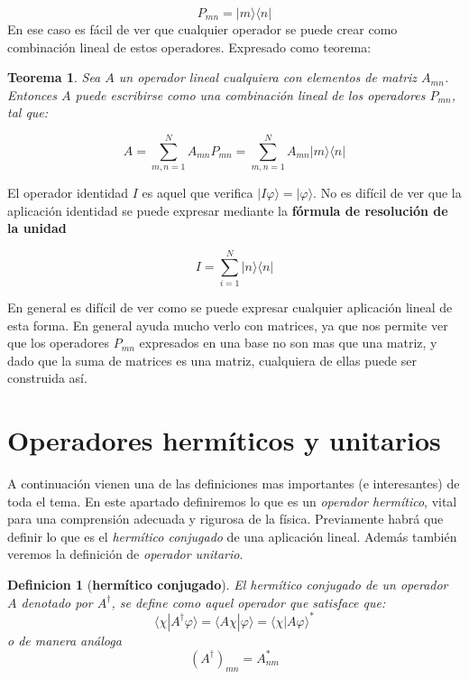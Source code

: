 \documentclass[12pt]{book}
\numberwithin{equation}{chapter}
\numberwithin{figure}{chapter}
\newtheorem{theorem}{Teorema}[section]
\newtheorem{definition}{Definicion}[section]
\begin{document}
\begin{equation}
P_{mn} = | m \rangle \langle n |
\end{equation}
En ese caso es fácil de ver que cualquier operador se puede crear como combinación lineal de estos operadores. Expresado como teorema:

\begin{theorem}
Sea $A$ un operador lineal cualquiera con elementos de matriz $A_{mn}$. Entonces $A$ puede escribirse como una combinación lineal de los operadores $P_{mn}$, tal que:

\begin{equation}
A = \sum_{m,n=1}^N A_{mn} P_{mn} = \sum_{m,n=1}^N A_{mn} | m \rangle \langle n | 
\end{equation} 
\end{theorem}
El operador identidad $I$ es aquel que verifica $|I \varphi \rangle = | \varphi \rangle$. No es difícil de ver que la aplicación identidad se puede expresar mediante la \textbf{fórmula de resolución de la unidad}

\begin{equation}
I = \sum_{i=1}^N | n \rangle \langle n |
\end{equation}

En general es difícil de ver como se puede expresar cualquier aplicación lineal de esta forma. En general ayuda mucho verlo con matrices, ya que nos permite ver que los operadores $P_{mn}$ expresados en una base no son mas que una matriz, y dado que la suma de matrices es una matriz, cualquiera de ellas puede ser construida así. \\


\section{Operadores hermíticos y unitarios}

A continuación vienen una de las definiciones mas importantes (e interesantes) de toda el tema. En este apartado definiremos lo que es un \textit{operador hermítico}, vital para una comprensión adecuada y rigurosa de la física. Previamente habrá que definir lo que es el \textit{hermítico conjugado} de una aplicación lineal. Además también veremos la definición de \textit{operador unitario}. \\

\begin{definition}[\textbf{hermítico conjugado}]
El hermítico conjugado de un operador $A$ denotado por $A^\dagger$, se define como aquel operador que satisface que:
\begin{equation}
\langle \chi | A^\dagger \varphi \rangle = \langle A \chi | \varphi \rangle = \langle \chi | A \varphi \rangle^*
\end{equation} 
o de manera análoga
\begin{equation}
(A^\dagger)_{mn} = A_{nm}^*
\end{equation}
\end{definition}
\end{document}

